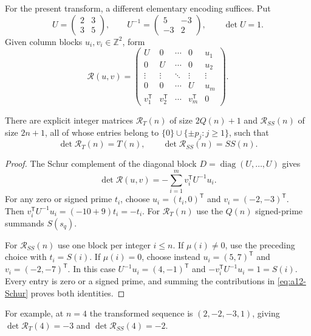 For the present transform, a different elementary encoding suffices.
Put
\begin{equation}
\label{eq:a12-prime-block-matrix}
U=\begin{pmatrix}2&3\\3&5\end{pmatrix},\qquad
U^{-1}=\begin{pmatrix}5&-3\\-3&2\end{pmatrix},\qquad \det U=1.
\end{equation}
Given column blocks $u_i,v_i\in\mathbb Z^2$, form
\begin{equation}
\label{eq:a12-bordered-matrix}
\mathcal R(u,v)=
\begin{pmatrix}
U&0&\cdots&0&u_1\\
0&U&\cdots&0&u_2\\
\vdots&\vdots&\ddots&\vdots&\vdots\\
0&0&\cdots&U&u_m\\
v_1^\mathsf{T}&v_2^\mathsf{T}&\cdots&v_m^\mathsf{T}&0
\end{pmatrix}.
\end{equation}
\begin{theorem}
\label{thm:a12-determinants}
There are explicit integer matrices $\mathcal R_T(n)$ of size
$2Q(n)+1$ and $\mathcal R_{SS}(n)$ of size $2n+1$, all of whose entries
belong to $\{0\}\cup\{\pm p_j:j\ge1\}$, such that
\begin{equation}
\label{eq:a12-det-identities}
\boxed{\det\mathcal R_T(n)=T(n),\qquad
\det\mathcal R_{SS}(n)=SS(n).}
\end{equation}
\end{theorem}
\begin{proof}
The Schur complement of the diagonal block
$D=\operatorname{diag}(U,\ldots,U)$ gives
\begin{equation}
\label{eq:a12-Schur}
\det\mathcal R(u,v)=-\sum_{i=1}^m v_i^\mathsf{T}U^{-1}u_i.
\end{equation}
For any zero or signed prime $t_i$, choose
$u_i=(t_i,0)^\mathsf{T}$ and $v_i=(-2,-3)^\mathsf{T}$.
Then
$v_i^\mathsf{T}U^{-1}u_i=(-10+9)t_i=-t_i$.
For $\mathcal R_T(n)$ use the $Q(n)$ signed-prime summands $S(s_q)$.

For $\mathcal R_{SS}(n)$ use one block per integer $i\le n$.
If $\mu(i)\ne0$, use the preceding choice with $t_i=S(i)$.
If $\mu(i)=0$, choose instead
$u_i=(5,7)^\mathsf{T}$ and $v_i=(-2,-7)^\mathsf{T}$.
In this case $U^{-1}u_i=(4,-1)^\mathsf{T}$ and
$-v_i^\mathsf{T}U^{-1}u_i=1=S(i)$.
Every entry is zero or a signed prime, and summing the contributions
in \eqref{eq:a12-Schur} proves both identities.
\end{proof}
For example, at $n=4$ the transformed sequence is $(2,-2,-3,1)$, giving
$\det\mathcal R_T(4)=-3$ and $\det\mathcal R_{SS}(4)=-2$.

